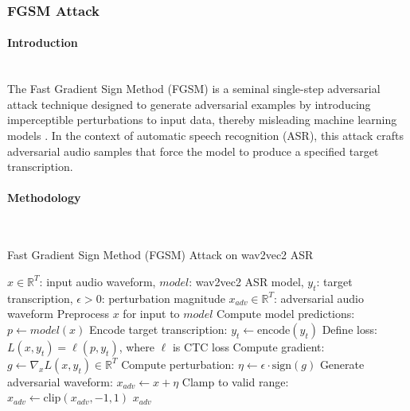 \documentclass[../main.tex]{subfiles}
\begin{document}
\subsubsection{FGSM Attack}
\label{subsec:fgsm_asr}
\paragraph{Introduction}\leavevmode\\
The Fast Gradient Sign Method (FGSM) is a seminal single-step adversarial attack technique designed to generate adversarial examples by introducing imperceptible perturbations to input data, thereby misleading machine learning models \cite{goodfellow2015explaining}. In the context of automatic speech recognition (ASR), this attack crafts adversarial audio samples that force the model to produce a specified target transcription\cite{zelasko2021adversarial}.

\paragraph{Methodology}\leavevmode\\
\begin{breakablealgorithm}{Fast Gradient Sign Method (FGSM) Attack on wav2vec2 ASR}
\begin{algorithmic}[1]
\Require $x \in \mathbb{R}^T$: input audio waveform, $model$: wav2vec2 ASR model, $y_t$: target transcription, $\epsilon > 0$: perturbation magnitude
\Ensure $x_{adv} \in \mathbb{R}^T$: adversarial audio waveform
\State Preprocess $x$ for input to $model$ 
\State Compute model predictions: $p \gets model(x)$ 
\State Encode target transcription: $y_t \gets \text{encode}(y_t)$ 
\State Define loss: $L(x, y_t) = \ell(p, y_t)$, where $\ell$ is CTC loss 
\State Compute gradient: $g \gets \nabla_x L(x, y_t) \in \mathbb{R}^T$ 
\State Compute perturbation: $\eta \gets \epsilon \cdot \text{sign}(g)$ 
\State Generate adversarial waveform: $x_{adv} \gets x + \eta$
\State Clamp to valid range: $x_{adv} \gets \text{clip}(x_{adv}, -1, 1)$ 
\State \Return $x_{adv}$ 
\end{algorithmic}
\end{breakablealgorithm}
\end{document}
